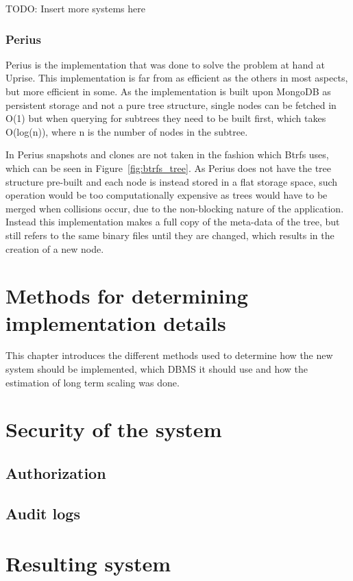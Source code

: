 \documentclass[a4paper,12pt]{article}
\begin{document}
TODO: Insert more systems here

\subsubsection{Perius}
Perius is the implementation that was done to solve the problem at hand at Uprise. This implementation is far from as 
efficient as the others in most aspects, but more efficient in some. As the implementation is built upon MongoDB as 
persistent storage and not a pure tree structure, single nodes can be fetched in O(1) but when querying for subtrees 
they need to be built first, which takes O(log(n)), where n is the number of nodes in the subtree. 

In Perius snapshots and clones are not taken in the fashion which Btrfs uses, which can be seen in 
Figure~\ref{fig:btrfs_tree}. As Perius does not have the tree structure pre-built and each node is instead stored in a 
flat storage space, such operation would be too computationally expensive as trees would have to be merged when 
collisions occur, due to the non-blocking nature of the application. Instead this implementation makes a full copy of 
the meta-data of the tree, but still refers to the same binary files until they are changed, which results in the 
creation of a new node.



\section{Methods for determining\\implementation details}
This chapter introduces the different methods used to determine how the new system should be implemented, 
which DBMS it should use and how the estimation of long term scaling was done.

\section{Security of the system}
\subsection{Authorization}
\subsection{Audit logs}


\section{Resulting system}
\end{document}
